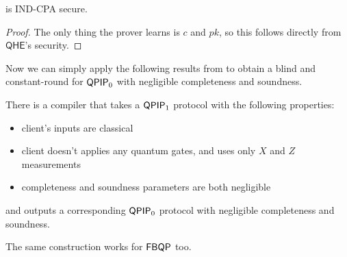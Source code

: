 \begin{thm}
	 is IND-CPA secure.
\end{thm}
\begin{proof}
	The only thing the prover learns is $c$ and $pk$, so this follows directly from $\mathsf{QHE}$'s security.
\end{proof}

Now we can simply apply the following results from \cite{parallelrep} to obtain a blind and constant-round for $\operatorname{\mathsf{QPIP}}_0$ with negligible completeness and soundness.
\begin{thm}
	There is a compiler that takes a $\operatorname{\mathsf{QPIP}}_1$ protocol with the following properties:
	\begin{itemize}
		\item client's inputs are classical
		\item client doesn't applies any quantum gates, and uses only $X$ and $Z$ measurements
		\item completeness and soundness parameters are both negligible
	\end{itemize}
	and outputs a corresponding $\operatorname{\mathsf{QPIP}}_0$ protocol with negligible completeness and soundness.
\end{thm}

\begin{rmk}
	The same construction works for $\operatorname{\mathsf{FBQP}}$ too.
\end{rmk}
